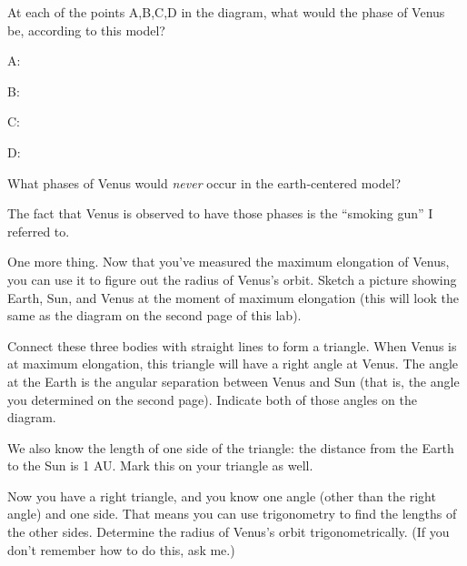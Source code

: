 At each of the points A,B,C,D in the diagram, what would the phase
of Venus be, according to this model?

A:

B:

C: 

D:

What phases of Venus would {\it never} occur in the earth-centered
model?

\answerspace{ 0.7in}

The fact that Venus is observed to have those phases is the ``smoking
gun'' I referred to.

\pagebreak[4]
One more thing.  Now that you've measured the maximum elongation of
Venus, you can use it to figure out the radius of Venus's orbit.
Sketch a picture showing Earth, Sun, and Venus at the moment of 
maximum elongation (this will look the same as the diagram on the
second page of this lab).  

\answerspace{ 2in}

Connect these three bodies with straight lines to form a triangle.
When Venus is at maximum elongation, this triangle will have a right
angle at Venus.  The angle at the Earth is the angular separation
between Venus and Sun (that is, the angle you determined on the second page).
Indicate both of those angles on the diagram.

We also know the length of one side of the triangle: the distance from
the Earth to the Sun is 1 AU.  Mark this on your triangle as well.

Now you have a right triangle, and you know one angle (other
than the right angle) and one side.
That means you can use trigonometry to find the lengths of the
other sides.  Determine the radius of Venus's orbit trigonometrically.
(If you don't remember how to do this, ask me.)



